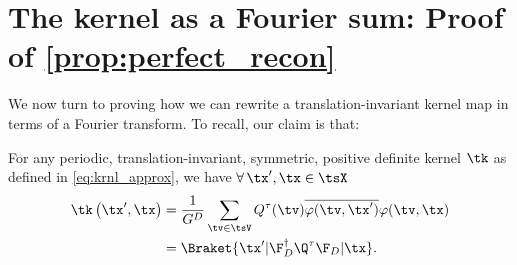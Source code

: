 \setcounter{equation}{0}
\section{The kernel as a Fourier sum: Proof of \texorpdfstring{\cref{prop:perfect_recon}}{Proposition 5.1}}
\label{app:perfect_recon}
We now turn to proving how we can rewrite a translation-invariant kernel map in terms of a Fourier transform. To recall, our claim is that:

{
\begin{proposition*} %
  For any periodic, translation-invariant, symmetric, positive definite kernel $\tk$ as defined in \cref{eq:krnl_approx},
  we have $\forall\, \tx',\tx\in\tsX$
  \begin{align*}
    \tk\left(\tx',\tx\right) &= \frac{1}{G^D} \sum_{\tv\in\tsV}Q^{\tau}(\tv)\overline{\varphi(\tv,\tx')}\varphi(\tv,\tx)\nonumber\\
                            &=\Braket{\tx'|\F_{D}^\dag \Q^{\tau} \F_{D}|\tx}.
  \end{align*}
\end{proposition*}
}

